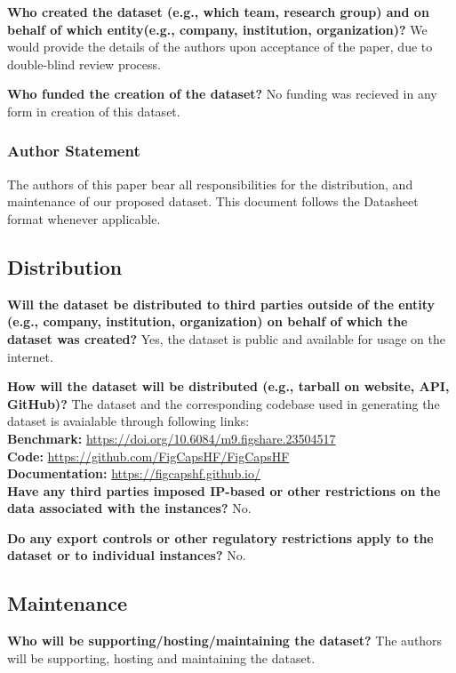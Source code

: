 \documentclass[11pt]{article}
\renewcommand{\cite}[1]{\citep{#1}}
\begin{document}
\textbf{Who created the dataset (e.g., which team, research group) and on behalf of which entity(e.g., company, institution, organization)?} We would provide the details of the authors upon acceptance of the paper, due to double-blind review process.

\textbf{Who funded the creation of the dataset?} No funding was recieved in any form in creation of this dataset.

\subsubsection{Author Statement}
The authors of this paper bear all responsibilities for the distribution, and maintenance of our proposed dataset. This document follows the Datasheet format \cite{gebru2021datasheets} whenever applicable.

\subsection{Distribution}

\textbf{Will the dataset be distributed to third parties outside of the entity (e.g., company, institution, organization) on behalf of which the dataset was created?} Yes, the dataset is public and available for usage on the internet.

\textbf{How will the dataset will be distributed (e.g., tarball on website, API, GitHub)?} The dataset and the corresponding codebase used in generating the dataset is avaialable through following links:\\
\small
\textbf{Benchmark:} \url{https://doi.org/10.6084/m9.figshare.23504517}\\
\small
\textbf{Code:} \url{https://github.com/FigCapsHF/FigCapsHF}\\
\small
\textbf{Documentation:} \url{https://figcapshf.github.io/}\\

\textbf{Have any third parties imposed IP-based or other restrictions on the data associated with the
instances?} No.

\textbf{Do any export controls or other regulatory restrictions apply to the dataset or to individual instances?} No.

\subsection{Maintenance}

\textbf{Who will be supporting/hosting/maintaining the dataset?} The authors will be supporting, hosting and maintaining the dataset.
\end{document}
